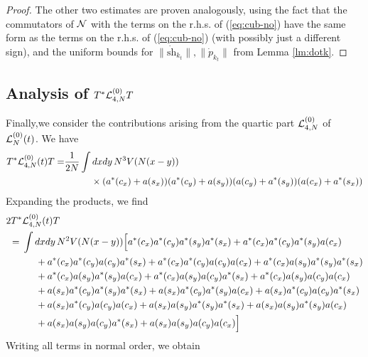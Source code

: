 \documentclass[11pt,a4paper]{article}
\newcommand{\cL}{{\cal L}}
\newcommand{\cN}{{\cal N}}
\begin{document}
\begin{proof}
The other two estimates are proven analogously, using the fact that the commutators of $\cN$ with the terms on the r.h.s. of (\ref{eq:cub-no}) have the same form as the terms on the r.h.s. of (\ref{eq:cub-no}) (with possibly just a different sign), and the uniform bounds for $\| \dot{\text{sh}}_{k_t} \|, \| \dot{p}_{k_t} \|$ from Lemma \ref{lm:dotk}.
\end{proof}

\subsection{Analysis of $T^* \cL^{(0)}_{4,N} T$}

Finally,we consider the contributions arising from the quartic part $\cL_{4,N}^{(0)}$ of $\cL_N^{(0)} (t)$. We have
\[\begin{split} T^* \cL_{4,N}^{(0)} (t) T = &\frac{1}{2N} \int dx dy \, N^3 V(N (x-y)) \\ &\hspace{1cm} \times (a^* (c_x) + a (s_x)) (a^* (c_y) + a (s_y)) (a (c_y) + a^* (s_y)) (a(c_x) + a^* (s_x)) \end{split} \] 
Expanding the products, we find 
\[ \begin{split} 
2 T^* & \cL_{4,N}^{(0)} (t) T \\ =  \; & \int dx dy \, N^2 V (N (x-y)) \Big[ a^* (c_x) a^* (c_y) a^* (s_y) a^* (s_x) + a^* (c_x) a^* (c_y) a^* (s_y) a (c_x) \\ &\hspace{.5cm} + a^* (c_x) a^* (c_y) a(c_y) a^* (s_x) + a^* (c_x) a^* (c_y) a (c_y) a (c_x)  + a^* (c_x) a (s_y) a^* (s_y) a^* (s_x)  \\ &\hspace{.5cm}  + a^* (c_x) a (s_y) a^* (s_y) a (c_x) + a^* (c_x) a (s_y) a(c_y) a^* (s_x) + a^* (c_x) a (s_y) a (c_y) a (c_x)  \\ &\hspace{.5cm}  + a (s_x) a^* (c_y) a^* (s_y) a^* (s_x) + a (s_x) a^* (c_y) a^* (s_y) a (c_x) + a (s_x) a^* (c_y) a(c_y) a^* (s_x)  \\ &\hspace{.5cm} + a (s_x) a^* (c_y) a (c_y) a (c_x)  + a (s_x) a (s_y) a^* (s_y) a^* (s_x) + a (s_x) a (s_y) a^* (s_y) a (c_x)  \\ &\hspace{.5cm}  + a (s_x) a (s_y) a(c_y) a^* (s_x) + a (s_x) a (s_y) a (c_y) a (c_x) \Big] 
\end{split} \]
Writing all terms in normal order, we obtain
\end{document}
